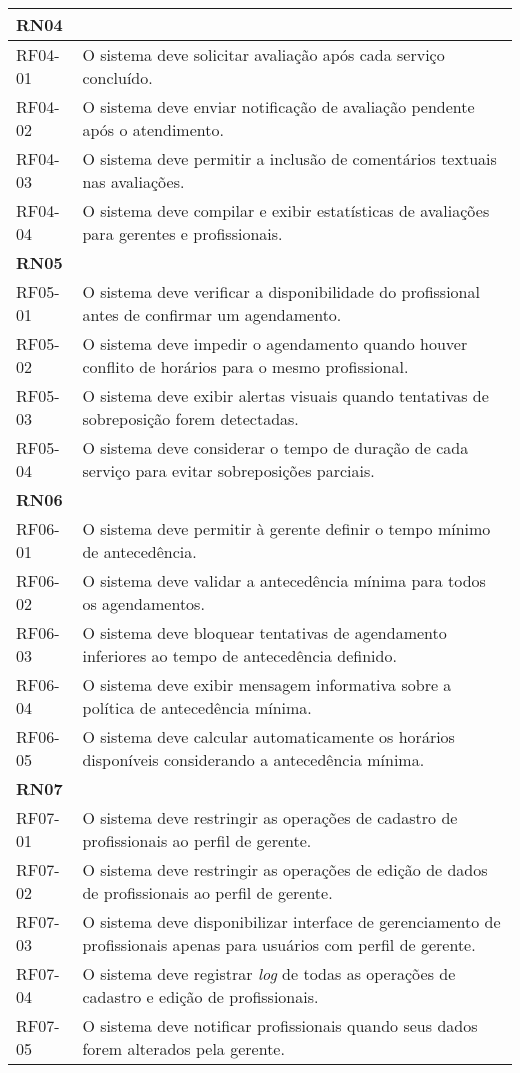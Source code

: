 \begin{longtable}{|p{}|p{}|}
	\multicolumn{2}{|l|}{\textbf{RN04}} \\ \hline
	RF04-01 & O sistema deve solicitar avaliação após cada serviço concluído. \\ \hline
	RF04-02 & O sistema deve enviar notificação de avaliação pendente após o atendimento. \\ \hline
	RF04-03 & O sistema deve permitir a inclusão de comentários textuais nas avaliações. \\ \hline
	RF04-04 & O sistema deve compilar e exibir estatísticas de avaliações para gerentes e profissionais. \\ \hline
	
	\multicolumn{2}{|l|}{\textbf{RN05}} \\ \hline
	RF05-01 & O sistema deve verificar a disponibilidade do profissional antes de confirmar um agendamento. \\ \hline
	RF05-02 & O sistema deve impedir o agendamento quando houver conflito de horários para o mesmo profissional. \\ \hline
	RF05-03 & O sistema deve exibir alertas visuais quando tentativas de sobreposição forem detectadas. \\ \hline
	RF05-04 & O sistema deve considerar o tempo de duração de cada serviço para evitar sobreposições parciais. \\ \hline
	
	\multicolumn{2}{|l|}{\textbf{RN06}} \\ \hline
	RF06-01 & O sistema deve permitir à gerente definir o tempo mínimo de antecedência. \\ \hline
	RF06-02 & O sistema deve validar a antecedência mínima para todos os agendamentos. \\ \hline
	RF06-03 & O sistema deve bloquear tentativas de agendamento inferiores ao tempo de antecedência definido. \\ \hline
	RF06-04 & O sistema deve exibir mensagem informativa sobre a política de antecedência mínima. \\ \hline
	RF06-05 & O sistema deve calcular automaticamente os horários disponíveis considerando a antecedência mínima. \\ \hline
	
	\multicolumn{2}{|l|}{\textbf{RN07}} \\ \hline
	RF07-01 & O sistema deve restringir as operações de cadastro de profissionais ao perfil de gerente. \\ \hline
	RF07-02 & O sistema deve restringir as operações de edição de dados de profissionais ao perfil de gerente. \\ \hline
	RF07-03 & O sistema deve disponibilizar interface de gerenciamento de profissionais apenas para usuários com perfil de gerente. \\ \hline
	RF07-04 & O sistema deve registrar \emph{log} de todas as operações de cadastro e edição de profissionais. \\ \hline
	RF07-05 & O sistema deve notificar profissionais quando seus dados forem alterados pela gerente. \\ \hline
	

\end{longtable}
